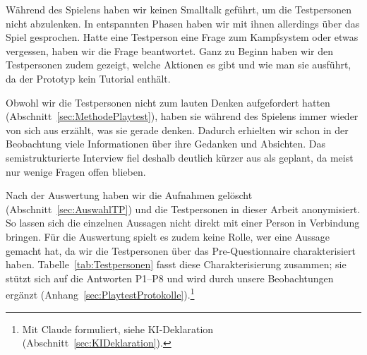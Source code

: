 \documentclass[../Main.tex]{subfiles}
\begin{document}
Während des Spielens haben wir keinen Smalltalk geführt, um die Testpersonen nicht abzulenken. In entspannten Phasen haben wir mit ihnen allerdings über das Spiel gesprochen. Hatte eine Testperson eine Frage zum Kampfsystem oder etwas vergessen, haben wir die Frage beantwortet. Ganz zu Beginn haben wir den Testpersonen zudem gezeigt, welche Aktionen es gibt und wie man sie ausführt, da der Prototyp kein Tutorial enthält.

Obwohl wir die Testpersonen nicht zum lauten Denken aufgefordert hatten (Abschnitt~\ref{sec:MethodePlaytest}), haben sie während des Spielens immer wieder von sich aus erzählt, was sie gerade denken. Dadurch erhielten wir schon in der Beobachtung viele Informationen über ihre Gedanken und Absichten. Das semistrukturierte Interview fiel deshalb deutlich kürzer aus als geplant, da meist nur wenige Fragen offen blieben.

Nach der Auswertung haben wir die Aufnahmen gelöscht (Abschnitt~\ref{sec:AuswahlTP}) und die Testpersonen in dieser Arbeit anonymisiert. So lassen sich die einzelnen Aussagen nicht direkt mit einer Person in Verbindung bringen. Für die Auswertung spielt es zudem keine Rolle, wer eine Aussage gemacht hat, da wir die Testpersonen über das Pre-Questionnaire charakterisiert haben. Tabelle~\ref{tab:Testpersonen} fasst diese Charakterisierung zusammen; sie stützt sich auf die Antworten P1--P8 und wird durch unsere Beobachtungen ergänzt (Anhang~\ref{sec:PlaytestProtokolle}).\footnote{Mit Claude formuliert, siehe KI-Deklaration (Abschnitt~\ref{sec:KIDeklaration}).}
\end{document}

